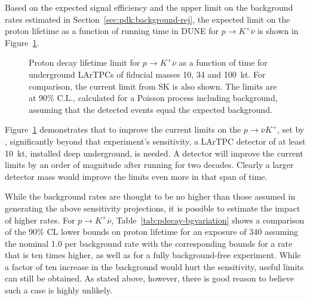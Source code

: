 Based on the expected signal efficiency and the upper limit on the
background rates estimated in Section~\ref{sec:pdk:background-rej}, 
the expected limit on the proton
lifetime as a function of running time in DUNE for $p \rightarrow K^+
\overline{\nu}$ is shown in 
Figure~\ref{fig:kdklimit}. 
\begin{figure}[!htb]
\centering
\caption[Proton decay lifetime limit for $p \rightarrow K^+ \overline{\nu}$
  versus time]{Proton decay lifetime limit for $p
  \rightarrow K^+ \overline{\nu}$ as a function of time for
  underground LArTPCs of fiducial masses 10, 34 and 100~kt.
  For comparison, the current limit from SK is also shown.
  The limits are at 90\% C.L., calculated for
  a Poisson process including background, assuming that the detected events
  equal the expected background.}
\label{fig:kdklimit}
\end{figure}
%
Figure~\ref{fig:kdklimit} demonstrates that 
to improve the current limits on
the $p \rightarrow \overline{\nu} K^+$, set by \superk, significantly
beyond that experiment's sensitivity, 
a LArTPC
detector of at least 10~kt, installed deep underground, is needed.
A  detector will improve the current limits by an order of
magnitude after running for two decades.  Clearly a larger detector
mass would improve the limits even more in that span of time.

While the background rates are thought to be no higher than those assumed 
in generating the above sensitivity projections, it is possible to estimate 
the impact of higher rates.  For $p\to K^+\overline{\nu}$, 
Table~\ref{tab:pdecay-bgvariation} shows a comparison of the 
$90\%$ CL lower bounds on proton lifetime for an exposure  of \SI{340}{\ktyr} 
assuming the nominal 1.0 per  \SI{}{\Mtyr} background rate with the 
corresponding bounds for a rate that is ten times higher, as well as for 
a fully background-free experiment.
%
%
While a factor of ten increase in the background would hurt the 
sensitivity, useful limits can still be obtained.  As stated 
above, however, there is good reason to believe such a case 
is highly unlikely.
%

